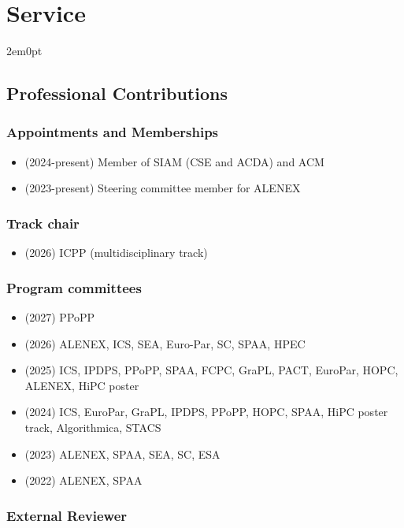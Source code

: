 \section{Service}
\begin{adjustwidth}{2em}{0pt}

\subsection{Professional Contributions}

\subsubsection{Appointments and Memberships}

\begin{itemize}
    \item (2024-present) Member of SIAM (CSE and ACDA) and ACM
    \item (2023-present) Steering committee member for ALENEX
\end{itemize}


\subsubsection{Track chair}
\begin{itemize}
\item (2026) ICPP (multidisciplinary track)
\end{itemize}

\subsubsection{Program committees}

\begin{itemize}
\item (2027) PPoPP
\item (2026) ALENEX, ICS, SEA, Euro-Par, SC, SPAA, HPEC
    \item (2025) ICS, IPDPS, PPoPP, SPAA, FCPC, GraPL, PACT, EuroPar, HOPC, ALENEX, HiPC poster
    \item (2024) ICS, EuroPar, GraPL, IPDPS, PPoPP, HOPC, SPAA, HiPC poster
    track, Algorithmica, STACS
    \item (2023) ALENEX, SPAA, SEA, SC, ESA
    \item (2022) ALENEX, SPAA
\end{itemize}
\subsubsection{External Reviewer}


\end{adjustwidth}
